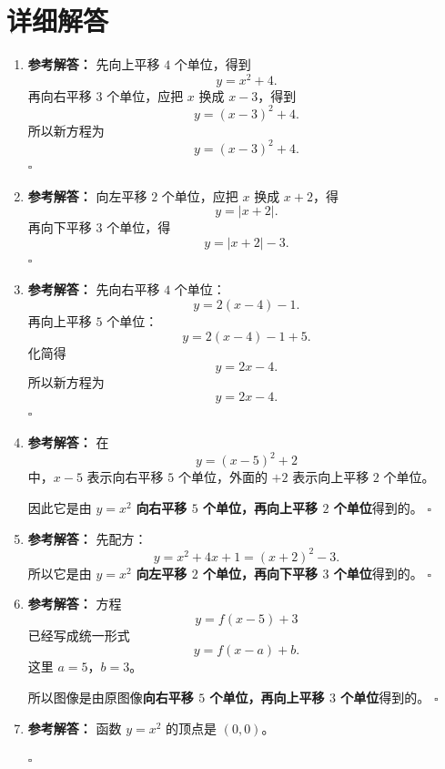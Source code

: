 \documentclass[11pt,a4paper,fontset=fandol]{ctexart}
\newenvironment{solution}{\par\noindent\textbf{参考解答：}}{\hfill$\square$\par}
\begin{document}
\newpage
\section{详细解答}

\begin{enumerate}
  \item \begin{solution}
  先向上平移 $4$ 个单位，得到
  \[
  y=x^2+4.
  \]
  再向右平移 $3$ 个单位，应把 $x$ 换成 $x-3$，得到
  \[
  y=(x-3)^2+4.
  \]
  所以新方程为
  \[
  \boxed{y=(x-3)^2+4}.
  \]
  \end{solution}

  \item \begin{solution}
  向左平移 $2$ 个单位，应把 $x$ 换成 $x+2$，得
  \[
  y=|x+2|.
  \]
  再向下平移 $3$ 个单位，得
  \[
  \boxed{y=|x+2|-3}.
  \]
  \end{solution}

  \item \begin{solution}
  先向右平移 $4$ 个单位：
  \[
  y=2(x-4)-1.
  \]
  再向上平移 $5$ 个单位：
  \[
  y=2(x-4)-1+5.
  \]
  化简得
  \[
  y=2x-4.
  \]
  所以新方程为
  \[
  \boxed{y=2x-4}.
  \]
  \end{solution}

  \item \begin{solution}
  在
  \[
  y=(x-5)^2+2
  \]
  中，$x-5$ 表示向右平移 $5$ 个单位，外面的 $+2$ 表示向上平移 $2$ 个单位。

  因此它是由 $y=x^2$ \textbf{向右平移 $5$ 个单位，再向上平移 $2$ 个单位}得到的。
  \end{solution}

  \item \begin{solution}
  先配方：
  \[
  y=x^2+4x+1=(x+2)^2-3.
  \]
  所以它是由 $y=x^2$ \textbf{向左平移 $2$ 个单位，再向下平移 $3$ 个单位}得到的。
  \end{solution}

  \item \begin{solution}
  方程
  \[
  y=f(x-5)+3
  \]
  已经写成统一形式
  \[
  y=f(x-a)+b.
  \]
  这里 $a=5$，$b=3$。

  所以图像是由原图像\textbf{向右平移 $5$ 个单位，再向上平移 $3$ 个单位}得到的。
  \end{solution}

  \item \begin{solution}
  函数 $y=x^2$ 的顶点是 $(0,0)$。


\end{solution}
\end{enumerate}
\end{document}
